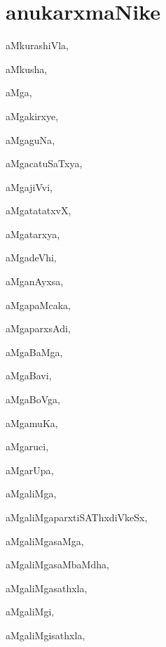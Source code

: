 \chapter*{anukarxmaNike}

\noindent
\begin{multicols}{3}
{\small
\noindent
{aMkurashiVla}, \pageref{aMkurashiVla}

\noindent
\noindent
{aMkusha}, \pageref{aMkusha}

\noindent
{aMga}, \pageref{aMga}

\noindent
{aMgakirxye}, \pageref{aMgakirxye}

\noindent
{aMgaguNa}, \pageref{aMgaguNa}

\noindent
{aMgacatuSaTxya}, \pageref{aMgacatuSaTxya}

\noindent
{aMgajiVvi}, \pageref{aMgajiVvi}

\noindent
{aMgatatatxvX}, \pageref{aMgatatatxvX}

\noindent
{aMgatarxya}, \pageref{aMgatarxya}

\noindent
{aMgadeVhi}, \pageref{aMgadeVhi}

\noindent
{aMganAyxsa}, \pageref{aMganAyxsa}

\noindent
{aMgapaMcaka}, \pageref{aMgapaMcaka}

\noindent
{aMgaparxsAdi}, \pageref{aMgaparxsAdi}

\noindent
{aMgaBaMga}, \pageref{aMgaBaMga}

\noindent
{aMgaBavi}, \pageref{aMgaBavi}

\noindent
{aMgaBoVga}, \pageref{aMgaBoVga}

\noindent
{aMgamuKa}, \pageref{aMgamuKa}

\noindent
{aMgaruci}, \pageref{aMgaruci}

\noindent
{aMgarUpa}, \pageref{aMgarUpa}

\noindent
{aMgaliMga}, \pageref{aMgaliMga}

\noindent
{aMgaliMgaparxtiSAThxdiVkeSx}, \pageref{aMgaliMgaparxtiSAThxdiVkeSx}

\noindent
{aMgaliMgasaMga}, \pageref{aMgaliMgasaMga}

\noindent
{aMgaliMgasaMbaMdha}, \pageref{aMgaliMgasaMbaMdha}

\noindent
{aMgaliMgasathxla}, \pageref{aMgaliMgasathxla}

\noindent
{aMgaliMgi}, \pageref{aMgaliMgi}

\noindent
{aMgaliMgisathxla}, \pageref{aMgaliMgisathxla}

}
\end{multicols}
